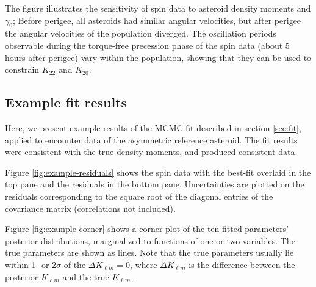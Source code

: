 \documentclass[fleqn,usenatbib]{mnras}
\begin{document}
The figure illustrates the sensitivity of spin data to asteroid density moments and $\gamma_0$; Before perigee, all asteroids had similar angular velocities, but after perigee the angular velocities of the population diverged. The oscillation periods observable during the torque-free precession phase of the spin data (about 5 hours after perigee) vary within the population, showing that they can be used to constrain $K_{22}$ and $K_{20}$.

\subsection{Example fit results}

Here, we present example results of the MCMC fit described in section \ref{sec:fit}, applied to encounter data of the asymmetric reference asteroid. The fit results were consistent with the true density moments, and produced consistent data.

Figure \ref{fig:example-residuals} shows the spin data with the best-fit overlaid in the top pane and the residuals in the bottom pane. Uncertainties are plotted on the residuals corresponding to the square root of the diagonal entries of the covariance matrix (correlations not included).


Figure \ref{fig:example-corner} shows a corner plot of the ten fitted parameters' posterior distributions, marginalized to functions of one or two variables. The true parameters are shown as lines. Note that the true parameters usually lie within 1- or 2$\sigma$ of the $\Delta K_{\ell m} = 0$, where $\Delta K_{\ell m}$ is the difference between the posterior $K_{\ell m}$ and the true $K_{\ell m}$.
\end{document}
